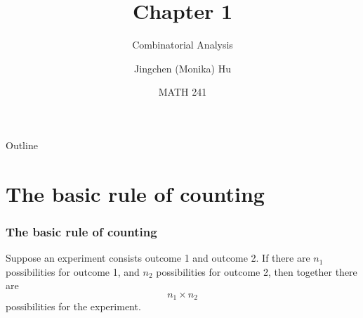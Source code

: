 \documentclass[slidestop,compress,mathserif]{beamer}
\title[Chapter 1]{Chapter 1}
\subtitle{Combinatorial Analysis}
\author[Jingchen (Monika) Hu]
{Jingchen (Monika) Hu}
\institute[Vassar]
{Vassar College}
\date[MATH 241]
{MATH 241}
\begin{document}


\begin{frame}%
\titlepage
\end{frame}

%
%
%
%


\begin{frame}{Outline}
\tableofcontents[hideallsubsections]
\end{frame}




\section{The basic rule of counting}
\begin{frame}\frametitle{The basic rule of counting}

\begin{dinglist}{\DingListSymbolA}
\item Suppose an experiment consists outcome 1 and outcome 2. If there are $n_1$ possibilities for outcome 1,
and $n_2$ possibilities for outcome 2, then together there are
\[
n_1 \times n_2
\]
possibilities for the experiment.
\end{dinglist}


\end{frame}
\end{document}
